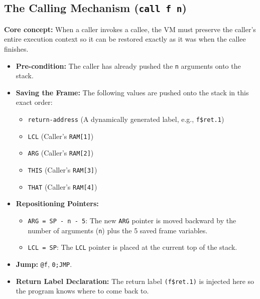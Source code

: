 \documentclass[12pt,a4paper]{article}
\begin{document}
\subsection{The Calling Mechanism (\texttt{call f n})}
\textbf{Core concept:} When a caller invokes a callee, the VM must preserve the caller's entire execution context so it can be restored exactly as it was when the callee finishes.
\begin{itemize}
    \item \textbf{Pre-condition:} The caller has already pushed the \texttt{n} arguments onto the stack.
    \item \textbf{Saving the Frame:} The following values are pushed onto the stack in this exact order:
    \begin{itemize}
        \item \texttt{return-address} (A dynamically generated label, e.g., \texttt{f\$ret.1})
        \item \texttt{LCL} (Caller's \texttt{RAM[1]})
        \item \texttt{ARG} (Caller's \texttt{RAM[2]})
        \item \texttt{THIS} (Caller's \texttt{RAM[3]})
        \item \texttt{THAT} (Caller's \texttt{RAM[4]})
    \end{itemize}
    \item \textbf{Repositioning Pointers:}
    \begin{itemize}
        \item \texttt{ARG = SP - n - 5}: The new \texttt{ARG} pointer is moved backward by the number of arguments (\texttt{n}) plus the 5 saved frame variables.
        \item \texttt{LCL = SP}: The \texttt{LCL} pointer is placed at the current top of the stack.
    \end{itemize}
    \item \textbf{Jump:} \texttt{@f}, \texttt{0;JMP}.
    \item \textbf{Return Label Declaration:} The return label \texttt{(f\$ret.1)} is injected here so the program knows where to come back to.
\end{itemize}
\end{document}
